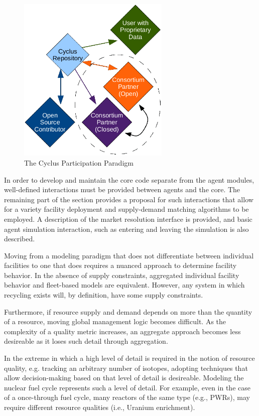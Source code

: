 \begin{figure}[htbp!]
  \begin{center}
    \includegraphics[height=8cm]{./figs/community.png}
  \end{center}
  \caption{The Cyclus Participation Paradigm} 
  \label{fig:community}
\end{figure}

In order to develop and maintain the core code separate from the agent modules,
well-defined interactions must be provided between agents and the \Cyclus
core. The remaining part of the section provides a proposal for such
interactions that allow for a variety facility deployment and supply-demand
matching algorithms to be employed. A description of the market resolution
interface is provided, and basic agent simulation interaction, such as entering
and leaving the simulation is also described.

Moving from a modeling paradigm that does not differentiate between individual
facilities to one that does requires a nuanced approach to determine facility
behavior. In the absence of supply constraints, aggregated individual facility
behavior and fleet-based models are equivalent. However, any system in which
recycling exists will, by definition, have some supply constraints. 

Furthermore, if resource supply and demand depends on more than the quantity of
a resource, moving global management logic becomes difficult. As the complexity
of a quality metric increases, an aggregate approach becomes less desireable as
it loses such detail through aggregation.

In the extreme in which a high level of detail is required in the notion of
resource quality, e.g. tracking an arbitrary number of isotopes, adopting
techniques that allow decision-making based on that level of detail is
desireable. Modeling the nuclear fuel cycle represents such a level of
detail. For example, even in the case of a once-through fuel cycle, many
reactors of the same type (e.g., PWRs), may require different resource qualities
(i.e., Uranium enrichment).

